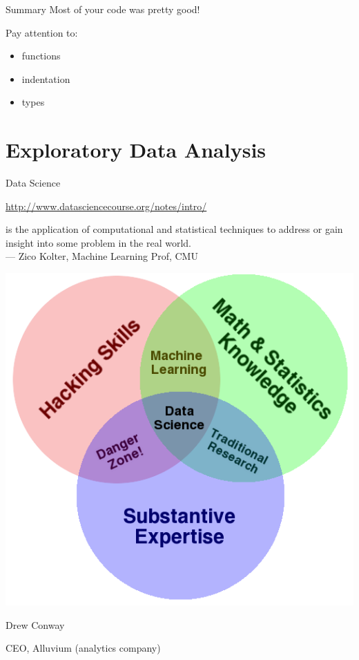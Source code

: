 \documentclass[aspectratio=169,usenames,dvipsnames]{beamer}
\begin{document}
\begin{frame}{Summary}
    Most of your code was pretty good!
    
    \vspace{1em}
    Pay attention to:
    \begin{itemize}
        \item functions
        \item indentation
        \item types
    \end{itemize}
\end{frame}





\section{Exploratory Data Analysis}
\frame{\tableofcontents[currentsubsection]}

\begin{frame}{Data Science}
\begin{reference}
    \url{http://www.datasciencecourse.org/notes/intro/}
\end{reference}
    \begin{definition}
     is the application of
    computational and statistical techniques to
    address or gain %
    insight into some problem in the real world. \\
    --- Zico Kolter, Machine Learning Prof, CMU
    \end{definition}
\end{frame}


\begin{frame}
    \centering
    \includegraphics[height=0.8\textheight]{fig/venn}

    Drew Conway

    CEO, Alluvium (analytics company)
\end{frame}
\end{document}
